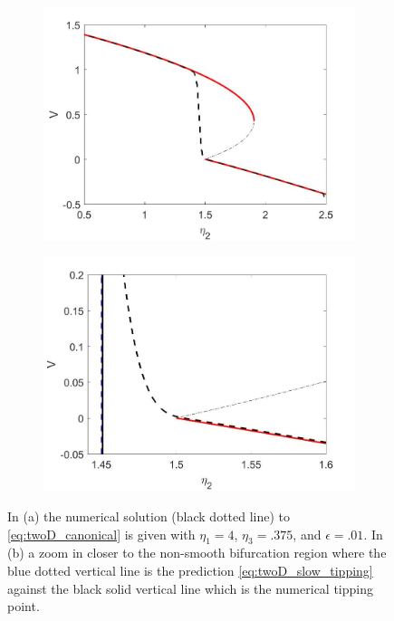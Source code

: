 \begin{figure}[H]
\centering
\begin{subfigure}{.5\textwidth}
 \centering
 \includegraphics[width=\linewidth]{twoD/slow_bif_diagram.jpg}
 \caption{}
\end{subfigure}%
\begin{subfigure}{.5\textwidth}
 \centering
 \includegraphics[width=\linewidth]{twoD/slow_bif_diagram_zoom.jpg}
 \caption{}
\end{subfigure}
\caption{In (a) the numerical solution (black dotted line) to \eqref{eq:twoD_canonical} is given with $\eta_1=4$, $\eta_3=.375$, and $\epsilon=.01$. In (b) a zoom in closer to the non-smooth bifurcation region where the blue dotted vertical line is the prediction \eqref{eq:twoD_slow_tipping} against the black solid vertical line which is the numerical tipping point.}
\label{fig:twoD_slow_Vnumerics}
\end{figure}

